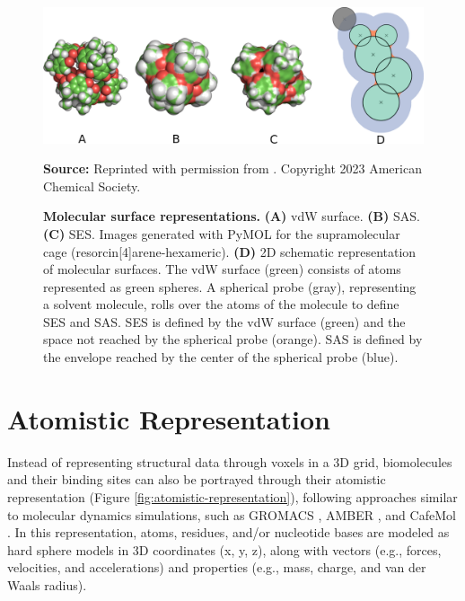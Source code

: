 \documentclass[Ingles]{phdthesis}
\def\eg{e.g.\onedot}
\begin{document}
\begin{figure}[ht]
  \centerline{\includegraphics[scale=1]{images/surface-representation.png}}
  \centerline{\tiny{\textbf{Source:} Reprinted with permission from \cite{guerra2023B}. Copyright 2023 American Chemical Society.}}
  \caption[Molecular surface representations]{\textbf{Molecular surface representations.} \textbf{(A)} vdW surface. \textbf{(B)} SAS. \textbf{(C)} SES. Images generated with PyMOL for the supramolecular cage (resorcin[4]arene-hexameric). \textbf{(D)} 2D schematic representation of molecular surfaces. The vdW surface (green) consists of atoms represented as green spheres. A spherical probe (gray), representing a solvent molecule, rolls over the atoms of the molecule to define SES and SAS. SES is defined by the vdW surface (green) and the space not reached by the spherical probe (orange). SAS is defined by the envelope reached by the center of the spherical probe (blue).}
  \label{fig:surface-representation}
\end{figure}

\section{Atomistic Representation}


Instead of representing structural data through voxels in a 3D grid, biomolecules and their binding sites can also be portrayed through their atomistic representation (Figure \ref{fig:atomistic-representation}), following approaches similar to molecular dynamics simulations, such as GROMACS \cite{gromacs}, AMBER \cite{amber}, and CafeMol \cite{kenzaki2011}. In this representation, atoms, residues, and/or nucleotide bases are modeled as hard sphere models in 3D coordinates (x, y, z), along with vectors (\eg, forces, velocities, and accelerations) and properties (\eg, mass, charge, and van der Waals radius).
\end{document}
